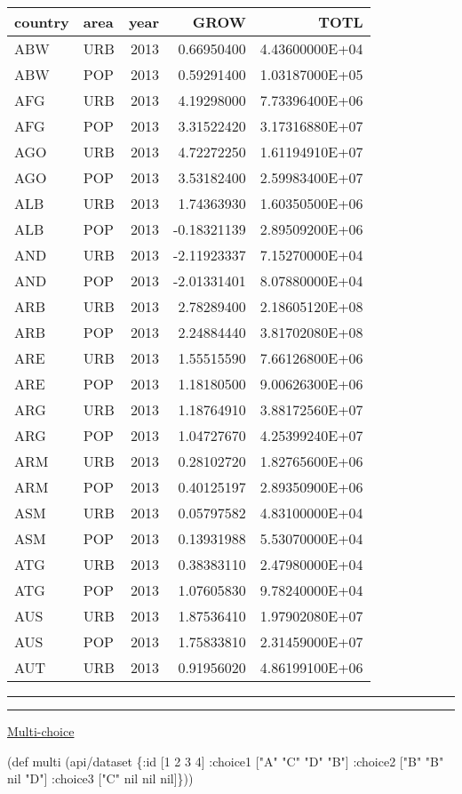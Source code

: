 \documentclass[]{article}
\newenvironment{Shaded}{\begin{snugshade}}{\end{snugshade}}
\newcommand{\DecValTok}[1]{\textcolor[rgb]{0.00,0.00,0.81}{#1}}
\newcommand{\StringTok}[1]{\textcolor[rgb]{0.31,0.60,0.02}{#1}}
\newcommand{\FunctionTok}[1]{\textcolor[rgb]{0.00,0.00,0.00}{#1}}
\newcommand{\VariableTok}[1]{\textcolor[rgb]{0.00,0.00,0.00}{#1}}
\newcommand{\BuiltInTok}[1]{#1}
\newcommand{\AttributeTok}[1]{\textcolor[rgb]{0.77,0.63,0.00}{#1}}
\newcommand{\NormalTok}[1]{#1}
\begin{document}
\begin{longtable}[]{@{}llrrr@{}}
\toprule
country & area & year & GROW & TOTL\tabularnewline
\midrule
\endhead
ABW & URB & 2013 & 0.66950400 & 4.43600000E+04\tabularnewline
ABW & POP & 2013 & 0.59291400 & 1.03187000E+05\tabularnewline
AFG & URB & 2013 & 4.19298000 & 7.73396400E+06\tabularnewline
AFG & POP & 2013 & 3.31522420 & 3.17316880E+07\tabularnewline
AGO & URB & 2013 & 4.72272250 & 1.61194910E+07\tabularnewline
AGO & POP & 2013 & 3.53182400 & 2.59983400E+07\tabularnewline
ALB & URB & 2013 & 1.74363930 & 1.60350500E+06\tabularnewline
ALB & POP & 2013 & -0.18321139 & 2.89509200E+06\tabularnewline
AND & URB & 2013 & -2.11923337 & 7.15270000E+04\tabularnewline
AND & POP & 2013 & -2.01331401 & 8.07880000E+04\tabularnewline
ARB & URB & 2013 & 2.78289400 & 2.18605120E+08\tabularnewline
ARB & POP & 2013 & 2.24884440 & 3.81702080E+08\tabularnewline
ARE & URB & 2013 & 1.55515590 & 7.66126800E+06\tabularnewline
ARE & POP & 2013 & 1.18180500 & 9.00626300E+06\tabularnewline
ARG & URB & 2013 & 1.18764910 & 3.88172560E+07\tabularnewline
ARG & POP & 2013 & 1.04727670 & 4.25399240E+07\tabularnewline
ARM & URB & 2013 & 0.28102720 & 1.82765600E+06\tabularnewline
ARM & POP & 2013 & 0.40125197 & 2.89350900E+06\tabularnewline
ASM & URB & 2013 & 0.05797582 & 4.83100000E+04\tabularnewline
ASM & POP & 2013 & 0.13931988 & 5.53070000E+04\tabularnewline
ATG & URB & 2013 & 0.38383110 & 2.47980000E+04\tabularnewline
ATG & POP & 2013 & 1.07605830 & 9.78240000E+04\tabularnewline
AUS & URB & 2013 & 1.87536410 & 1.97902080E+07\tabularnewline
AUS & POP & 2013 & 1.75833810 & 2.31459000E+07\tabularnewline
AUT & URB & 2013 & 0.91956020 & 4.86199100E+06\tabularnewline
\bottomrule
\end{longtable}

\begin{center}\rule{0.5\linewidth}{0.5pt}\end{center}

\begin{center}\rule{0.5\linewidth}{0.5pt}\end{center}

\href{https://tidyr.tidyverse.org/articles/pivot.html\#multi-choice}{Multi-choice}

\begin{Shaded}
\begin{Highlighting}[]
\NormalTok{(}\BuiltInTok{def}\FunctionTok{ multi }\NormalTok{(api/dataset \{}\AttributeTok{:id}\NormalTok{ [}\DecValTok{1} \DecValTok{2} \DecValTok{3} \DecValTok{4}\NormalTok{]}
                         \AttributeTok{:choice1}\NormalTok{ [}\StringTok{"A"} \StringTok{"C"} \StringTok{"D"} \StringTok{"B"}\NormalTok{]}
                         \AttributeTok{:choice2}\NormalTok{ [}\StringTok{"B"} \StringTok{"B"} \VariableTok{nil} \StringTok{"D"}\NormalTok{]}
                         \AttributeTok{:choice3}\NormalTok{ [}\StringTok{"C"} \VariableTok{nil} \VariableTok{nil} \VariableTok{nil}\NormalTok{]\}))}
\end{Highlighting}
\end{Shaded}
\end{document}
